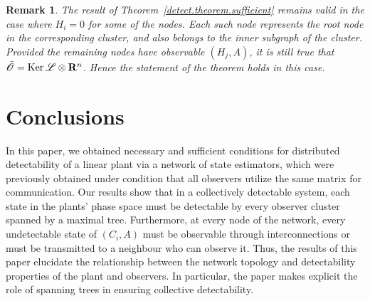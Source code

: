 \documentclass[a4paper,10pt,conference]{ieeeconf}
\newtheorem{remark}{Remark}
\begin{document}
\begin{remark}
  The result of Theorem~\ref{detect.theorem.sufficient} remains
  valid in the case where $H_i=0$ for some of the nodes. Each such node
  represents the root node in the corresponding cluster, and also belongs to
  the inner subgraph of the cluster. 
  Provided the remaining nodes have observable $(H_j,A)$, it is still true
  that $\bar{\mathcal{O}}=\mathop{\mathrm{Ker}}\nolimits\mathcal{L}\otimes \mathbf{R}^n$. Hence the
  statement of the theorem holds in this case.
\end{remark}

\section{Conclusions}\label{Concl}
In this paper, we obtained necessary and sufficient conditions for
distributed detectability of a linear plant via a network of state
estimators, which were previously obtained under condition that all
observers utilize the same matrix for communication. Our results show that
in a collectively detectable system, each state in the plants' phase space
must be detectable by every observer cluster spanned by a maximal
tree. Furthermore, at every node of the network, every undetectable state
of $(C_i,A)$ must be observable through interconnections or must be
transmitted to a neighbour who can observe it. Thus, the results of this
paper elucidate the relationship between the network topology and
detectability properties of the plant and observers. In particular, the paper
makes explicit the role of spanning trees in ensuring collective
detectability.    

 

\end{document}

